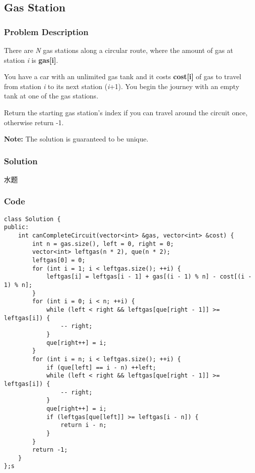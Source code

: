 \documentclass[courier]{article}
\begin{document}
\begin{CJK*}{UTF8}{gkai}
\subsection{ Gas Station }

\subsubsection*{Problem Description}
There are \emph{N} gas stations along a circular route, where the amount of gas at station \emph{i} is \textbf{gas[i]}.

You have a car with an unlimited gas tank and it costs \textbf{cost[i]} of gas to travel from station \emph{i} to its next station (\emph{i}+1). You begin the journey with an empty tank at one of the gas stations.

Return the starting gas station's index if you can travel around the circuit once, otherwise return -1.

\textbf{Note:}
The solution is guaranteed to be unique.



\subsubsection*{Solution}
水题

\subsubsection*{Code}
\begin{lstlisting}
class Solution {
public:
    int canCompleteCircuit(vector<int> &gas, vector<int> &cost) {
        int n = gas.size(), left = 0, right = 0;
        vector<int> leftgas(n * 2), que(n * 2);
        leftgas[0] = 0;
        for (int i = 1; i < leftgas.size(); ++i) {
            leftgas[i] = leftgas[i - 1] + gas[(i - 1) % n] - cost[(i - 1) % n];
        }
        for (int i = 0; i < n; ++i) {
            while (left < right && leftgas[que[right - 1]] >= leftgas[i]) {
                -- right;
            }
            que[right++] = i;
        }
        for (int i = n; i < leftgas.size(); ++i) {
            if (que[left] == i - n) ++left;
            while (left < right && leftgas[que[right - 1]] >= leftgas[i]) {
                -- right;
            }
            que[right++] = i;
            if (leftgas[que[left]] >= leftgas[i - n]) {
                return i - n;
            }
        }
        return -1;
    }
};s 
\end{lstlisting}



\end{CJK*}
\end{document}
